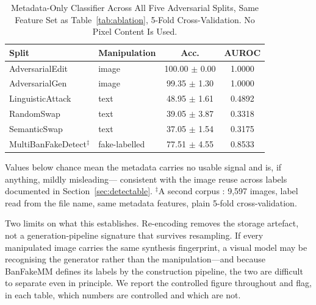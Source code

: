 \documentclass[pdflatex,sn-mathphys-num]{sn-jnl}
\begin{document}
\begin{table}[!tb]
\caption{Metadata-Only Classifier Across All Five Adversarial Splits, Same
Feature Set as Table~\ref{tab:ablation}, 5-Fold Cross-Validation. No Pixel
Content Is Used.}
\label{tab:shortcut}
\centering
\setlength{\tabcolsep}{4pt}
\footnotesize
\begin{tabular}{llcc}
\toprule
\textbf{Split} & \textbf{Manipulation} & \textbf{Acc.} & \textbf{AUROC} \\
\midrule
AdversarialEdit  & image & 100.00 $\pm$ 0.00 & 1.0000 \\
AdversarialGen   & image & 99.35 $\pm$ 1.30 & 1.0000 \\
\midrule
LinguisticAttack & text  & 48.95 $\pm$ 1.61 & 0.4892 \\
RandomSwap       & text  & 39.05 $\pm$ 3.87 & 0.3318 \\
SemanticSwap     & text  & 37.05 $\pm$ 1.54 & 0.3175 \\
\midrule
MultiBanFakeDetect$^{\ddagger}$ & fake-labelled & 77.51 $\pm$ 4.55 & 0.8533 \\
\bottomrule
\end{tabular}
\par\smallskip\parbox{\linewidth}{\footnotesize \footnotesize Values below chance mean the
metadata carries no usable signal and is, if anything, mildly misleading---
consistent with the image reuse across labels documented in
Section~\ref{sec:detectable}. $^{\ddagger}$A second corpus
\cite{multibanfake}: 9{,}597 images, label read from the file name, same
metadata features, plain 5-fold cross-validation.}
\end{table}

Two limits on what this establishes. Re-encoding removes the storage artefact,
not a generation-pipeline signature that survives resampling. If every
manipulated image carries the same synthesis fingerprint, a visual model may be
recognising the generator rather than the manipulation---and because BanFakeMM
defines its labels by the construction pipeline, the two are difficult to
separate even in principle. We report the controlled figure throughout and
flag, in each table, which numbers are controlled and which are not.
\end{document}
